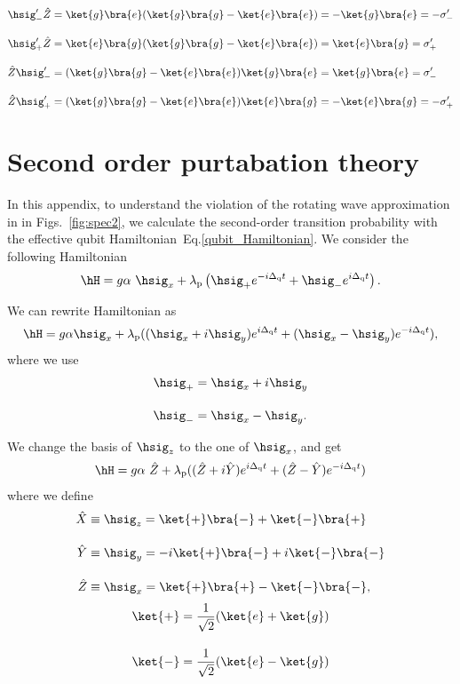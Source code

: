 \begin{align}
    \hsig_-^\prime\hat{Z}&=\ket{g}\bra{e}(\ket{g}\bra{g}-\ket{e}\bra{e})=-\ket{g}\bra{e}=-\sigma_-^\prime\\[10pt]
    \hsig_+^\prime\hat{Z}&=\ket{e}\bra{g}(\ket{g}\bra{g}-\ket{e}\bra{e})=\ket{e}\bra{g}=\sigma_+^\prime\\[10pt]
    \hat{Z}\hsig_-^\prime&=(\ket{g}\bra{g}-\ket{e}\bra{e})\ket{g}\bra{e}=\ket{g}\bra{e}=\sigma_-^\prime\\[10pt]
    \hat{Z}\hsig_+^\prime&=(\ket{g}\bra{g}-\ket{e}\bra{e})\ket{e}\bra{g}=-\ket{e}\bra{g}=-\sigma_+^\prime
\end{align}



\appendix
\section{Second order purtabation theory}\label{purtabation}
In this appendix, to understand the violation of the rotating wave approximation in in Figs.~\ref{fig:spec2}, we calculate the second-order transition probability with the effective qubit Hamiltonian~Eq.\eqref{qubit_Hamiltonian}.
We consider the following Hamiltonian
\begin{equation}
    \hH=g\alpha\ \hsig_x+\lambda_{\rm{p}}\left(\hsig_+ e^{-i\Delta _{\rm{q}}t}+\hsig_- e^{i\Delta _{\rm{q}}t}\right).
\end{equation}

We can rewrite Hamiltonian as
\begin{align}
    \hH=g\alpha\hsig_x + \lambda_{\rm{p}} ((\hsig_x+i\hsig_y)e^{i\Delta _{\rm{q}} t} + (\hsig_x-\hsig_y)e^{-i\Delta _{\rm{q}} t}),
\end{align}
where we use
\begin{align}
    \hsig_+&=\hsig_x+i\hsig_y\\[10pt]
    \hsig_-&=\hsig_x-\hsig_y.
\end{align}

We change the basis of $\hsig_z$ to the one of $\hsig_x$, and get
\begin{align}
    \hH=g\alpha\ \hat{Z} + \lambda_{\rm{p}} ((\hat{Z}+i\hat{Y})e^{i\Delta _{\rm{q}} t} + (\hat{Z}-\hat{Y})e^{-i\Delta _{\rm{q}} t})
\end{align}
where we define
\begin{align}
    \hat{X} &\equiv \hsig_z 
    = \ket{+}\bra{-} + \ket{-}\bra{+}\\[10pt]
    \hat{Y} &\equiv \hsig_y 
    = -i\ket{+}\bra{-} +i \ket{-}\bra{-}\\[10pt]
    \hat{Z} &\equiv \hsig_x 
    = \ket{+}\bra{+} - \ket{-}\bra{-},
\end{align}
\begin{align}
    \ket{+} &
    = \frac{1}{\sqrt{2}}
    (\ket{e} + \ket{g})\\[10pt]
    \ket{-} &
    = \frac{1}{\sqrt{2}}
    (\ket{e} - \ket{g})
\end{align}

